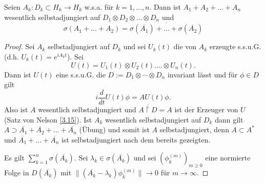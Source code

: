 \documentclass{mycourse}
\begin{document}
\begin{st}\label{8.7}
Seien $A_k: D_k \subset H_k \to H_k$ w.s.a. für $k=1,...,n$. Dann ist $A_1 + A_2 + ... +A_n$ wesentlich selbstadjungiert  auf $D_1 \otimes D_2 \otimes ... \otimes D_n$ und
\[
\sigma(A_1+... + A_2) = \overline{\sigma(\overline{A_1}) + ... + \sigma(\overline{A_2})}
\]
\end{st}
\begin{proof}
Sei $A_k$ selbstadjungiert auf $D_k$ und sei $U_k(t)$ die von $A_k$ erzeugte s.s.u.G. (d.h. $U_k(t) = e^{iA_k t}$). Sei
\[
U(t) = U_1(t) \otimes U_2(t) .... \otimes U_n(t).
\]
Dann ist $U(t)$ eine s.s.u.G. die $D:= D_1 \otimes \cdots \otimes D_n$ invariant lässt und für $\phi \in D$ gilt
\[
i \frac{d}{dt} U(t) \phi = AU(t) \phi.
\]
Also ist $A$ wesentlich selbstadjungiert und $\overline{A\upharpoonright D} = A$ ist der Erzeuger von $U$ (Satz von Nelson \ref{3.15}). Ist $A_k$ wesentlich selbstadjungiert auf $D_k$ dann gilt $A\supset \overline{A_1} + \overline{A_2} + ... + \overline{A_n}$ (Übung) und somit ist $A$ selbstadjungiert, denn $A\subset A^*$ und $\overline{A_1} +...+\overline{A_n}$ ist selbstadjungiert nach dem bereits gezeigten.

Es gilt $\sum_{k=1}^n \sigma(\overline{A_k})$.
Sei $\lambda_k \in \sigma(\overline{A_k})$ und sei $(\phi_k^{(m)})_{m\ge 0}$ eine normierte Folge in $D(\overline{A_k})$ mit $\| (\overline{A_k} -\lambda_k) \phi_k^{(m)}\| \to 0$ für $m\to \infty$.


\end{proof}
\end{document}
